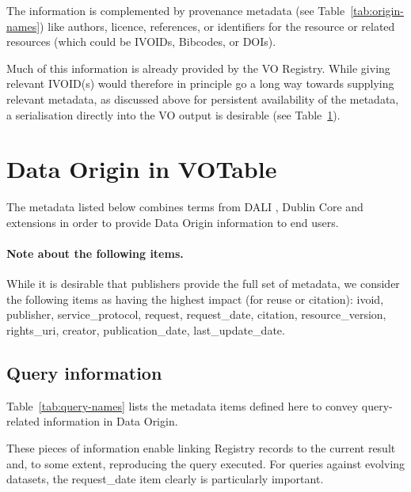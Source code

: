 \documentclass[11pt,a4paper]{ivoa}
\begin{document}
The information is complemented by provenance metadata (see Table~\ref{tab:origin-names}) like authors, licence, references, or identifiers
for the resource or related resources (which could be IVOIDs, Bibcodes, or DOIs).

Much of this information is already provided by the VO Registry.
While giving relevant IVOID(s) would therefore in principle go a long way
towards supplying relevant metadata, as discussed above for
persistent availability of the metadata, a serialisation
directly into the VO output is desirable
(see Table~\ref{sec:data-origin-in-votable}).


\section{Data Origin in VOTable}
\label{sec:data-origin-in-votable}
The metadata listed below combines terms from DALI \citep{2017ivoa.spec.0517D}, Dublin Core \citep{std:DUBLINCORE} and extensions in order to provide Data Origin information to end users.

\paragraph{Note about the following items.} 
While it is desirable that publishers provide the full set of
metadata, 
we consider the following items as having the highest impact (for reuse or citation):
ivoid, publisher, service\_protocol, request, request\_date,
citation, resource\_version, rights\_uri, creator, publication\_date,
last\_update\_date.


\subsection{Query information}
\label{sec:query-information}
Table~\ref{tab:query-names} lists the metadata items defined here to
convey query-related information in Data Origin.

These pieces of information enable linking Registry records to the
current result and, to some extent, reproducing the query executed.
For queries against evolving datasets, the request\_date item clearly is
particularly important.
\end{document}
